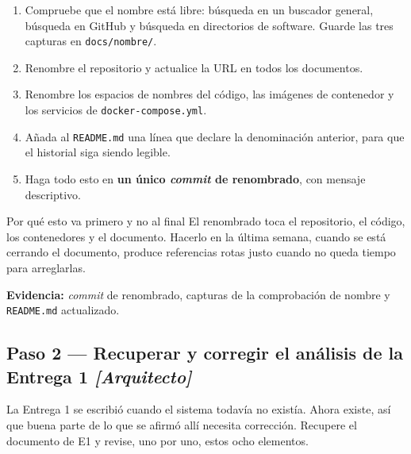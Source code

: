 \documentclass[11pt,a4paper]{article}
\newcommand{\paso}[1]{\subsection{#1}}
\begin{document}
	\begin{enumerate}[leftmargin=*,itemsep=3pt]
		\item Compruebe que el nombre está libre: búsqueda en un buscador general, búsqueda en GitHub y búsqueda en directorios de software. Guarde las tres capturas en \texttt{docs/nombre/}.
		\item Renombre el repositorio y actualice la URL en todos los documentos.
		\item Renombre los espacios de nombres del código, las imágenes de contenedor y los servicios de \texttt{docker-compose.yml}.
		\item Añada al \texttt{README.md} una línea que declare la denominación anterior, para que el historial siga siendo legible.
		\item Haga todo esto en \textbf{un único \emph{commit} de renombrado}, con mensaje descriptivo.
	\end{enumerate}
	
	\begin{avisoBox}{Por qué esto va primero y no al final}
		El renombrado toca el repositorio, el código, los contenedores y el documento. Hacerlo en la última semana, cuando se está cerrando el documento, produce referencias rotas justo cuando no queda tiempo para arreglarlas.
	\end{avisoBox}
	
	\textbf{Evidencia:} \emph{commit} de renombrado, capturas de la comprobación de nombre y \texttt{README.md} actualizado.
	
	\paso{Paso 2 --- Recuperar y corregir el análisis de la Entrega 1 \emph{[Arquitecto]}}
	
	La Entrega 1 se escribió cuando el sistema todavía no existía. Ahora existe, así que buena parte de lo que se afirmó allí necesita corrección. Recupere el documento de E1 y revise, uno por uno, estos ocho elementos.
	
\end{document}
